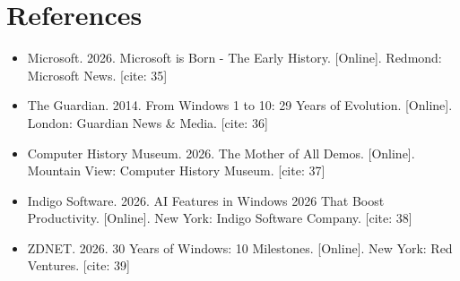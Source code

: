 \documentclass[12pt]{report}
\begin{document}
\section*{References}
\label{chap1:sec:references}
\begin{itemize}
    \item Microsoft. 2026. Microsoft is Born - The Early History. [Online]. Redmond: Microsoft News. [cite: 35]
    \item The Guardian. 2014. From Windows 1 to 10: 29 Years of Evolution. [Online]. London: Guardian News \& Media. [cite: 36]
    \item Computer History Museum. 2026. The Mother of All Demos. [Online]. Mountain View: Computer History Museum. [cite: 37]
    \item Indigo Software. 2026. AI Features in Windows 2026 That Boost Productivity. [Online]. New York: Indigo Software Company. [cite: 38]
    \item ZDNET. 2026. 30 Years of Windows: 10 Milestones. [Online]. New York: Red Ventures. [cite: 39]
\end{itemize}
\end{document}
